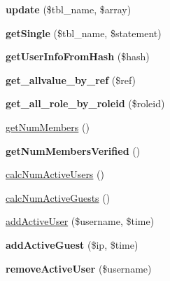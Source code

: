 \begin{DoxyCompactItemize}
\item 
\hypertarget{class_my_s_q_l_d_b_a134312836694a4e025824a0149dd08e0}{{\bfseries update} (\$tbl\-\_\-name, \$array)}\label{class_my_s_q_l_d_b_a134312836694a4e025824a0149dd08e0}

\item 
\hypertarget{class_my_s_q_l_d_b_a52ef17b80160a9675e3dc3857f88e478}{{\bfseries get\-Single} (\$tbl\-\_\-name, \$statement)}\label{class_my_s_q_l_d_b_a52ef17b80160a9675e3dc3857f88e478}

\item 
\hypertarget{class_my_s_q_l_d_b_ac3f2e9a7647a2c12c5c4f3d5c6b97ab5}{{\bfseries get\-User\-Info\-From\-Hash} (\$hash)}\label{class_my_s_q_l_d_b_ac3f2e9a7647a2c12c5c4f3d5c6b97ab5}

\item 
\hypertarget{class_my_s_q_l_d_b_a83fa9a78f55bfdf71fea71210905fe0c}{{\bfseries get\-\_\-allvalue\-\_\-by\-\_\-ref} (\$ref)}\label{class_my_s_q_l_d_b_a83fa9a78f55bfdf71fea71210905fe0c}

\item 
\hypertarget{class_my_s_q_l_d_b_a8d7b73bac573069f856e6caed6a69695}{{\bfseries get\-\_\-all\-\_\-role\-\_\-by\-\_\-roleid} (\$roleid)}\label{class_my_s_q_l_d_b_a8d7b73bac573069f856e6caed6a69695}

\item 
\hyperlink{class_my_s_q_l_d_b_a8ddca001249379f2cf7eaa51ed1f276b}{get\-Num\-Members} ()
\item 
\hypertarget{class_my_s_q_l_d_b_a920c32fee1f75ecb982b1c2e465a2562}{{\bfseries get\-Num\-Members\-Verified} ()}\label{class_my_s_q_l_d_b_a920c32fee1f75ecb982b1c2e465a2562}

\item 
\hyperlink{class_my_s_q_l_d_b_a5b4d46735c0d9a11f1d1e1cfea1f16f9}{calc\-Num\-Active\-Users} ()
\item 
\hyperlink{class_my_s_q_l_d_b_a2fbaaea8c51e8a2910e5313fcdfe24b9}{calc\-Num\-Active\-Guests} ()
\item 
\hyperlink{class_my_s_q_l_d_b_af26d48437f61452b0494eb5ff3623ba0}{add\-Active\-User} (\$username, \$time)
\item 
\hypertarget{class_my_s_q_l_d_b_ad77d3b1addff7d2c65d5df6f729f05ce}{{\bfseries add\-Active\-Guest} (\$ip, \$time)}\label{class_my_s_q_l_d_b_ad77d3b1addff7d2c65d5df6f729f05ce}

\item 
\hypertarget{class_my_s_q_l_d_b_a5e52a73027b6b58ed4c0c10312e88ad9}{{\bfseries remove\-Active\-User} (\$username)}\label{class_my_s_q_l_d_b_a5e52a73027b6b58ed4c0c10312e88ad9}


\end{DoxyCompactItemize}
